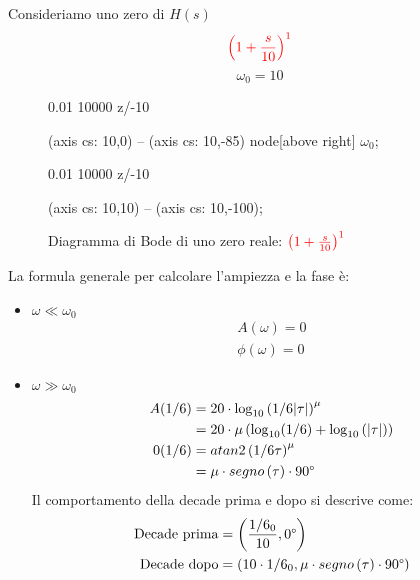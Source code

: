 \documentclass[a4paper]{article}
\begin{document}
\noindent
Consideriamo uno zero di \( H(s) \) 
\[
  \color{red} \left( 1 + \frac{s}{10} \right)^{1}
\] 
\[
\omega_0 = 10
\] 
\begin{figure}[H]
  \centering
  \begin{BodeMagPlot}[scale=1.5,ytick distance=20,ylabel={Ampiezza (dB)}] {0.01} {10000}
    {
      z/-10
    }

     (axis cs: 10,0) -- (axis cs: 10,-85) node[above right] {\( \omega_0 \)};
  \end{BodeMagPlot}

  \begin{BodePhPlot}[scale=1.5,ytick distance=45,ylabel={Fase (deg)},xlabel={Frequenza (rad/s)}] {0.01} {10000}
    {
      z/-10
    }

     (axis cs: 10,10) -- (axis cs: 10,-100);
  \end{BodePhPlot}
  \caption{Diagramma di Bode di uno zero reale: \( \color{red} \left( 1 + \frac{s}{10} \right)^{1} \) }
\end{figure}

\vspace{1em}
\noindent
La formula generale per calcolare l'ampiezza e la fase è:
\begin{itemize}
  \item \( \omega \ll \omega_0 \) 
    \[
    \begin{aligned}
      A(\omega) = 0\\
      \phi(\omega) = 0
    \end{aligned}
    \] 
  \item \( \omega \gg \omega_0 \) 
    \[
    \begin{aligned}
      A(1/6) &= 20 \cdot \log_{10} \left( 1/6 |\tau| \right)^{\mu}\\
                &= 20 \cdot \mu \left( \log_{10} (1/6) + \log_{10} \left( \left| \tau \right|  \right)  \right) \\
      0(1/6) &= atan2 \left( 1/6 \tau \right)^{\mu}\\
                   &= \mu \cdot segno \left( \tau \right) \cdot 90\degree
    \end{aligned}
    \] 
    Il comportamento della decade prima e dopo si descrive come:
    \[
      \begin{aligned}
        \text{Decade prima} &= \left( \frac{1/6_0}{10}, 0\degree \right) \\
        \text{Decade dopo} &= \left( 10 \cdot 1/6_0, \mu \cdot segno \left( \tau \right) \cdot 90\degree \right)
      \end{aligned}
    \] 
\end{itemize}
\end{document}
